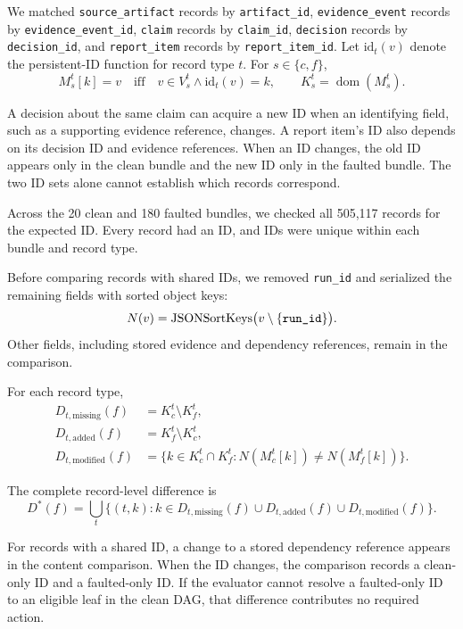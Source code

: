 \documentclass[sn-basic]{sn-jnl}%
\theoremstyle{thmstyleone}%
\theoremstyle{thmstyletwo}%
\theoremstyle{thmstylethree}%
\begin{document}
We matched \texttt{source\_artifact} records by \texttt{artifact\_id},
\texttt{evidence\_event} records by \texttt{evidence\_event\_id},
\texttt{claim} records by \texttt{claim\_id},
\texttt{decision} records by \texttt{decision\_id}, and
\texttt{report\_item} records by \texttt{report\_item\_id}.
Let \(\mathrm{id}_t(v)\) denote the persistent-ID function for record type \(t\).
For \(s \in \{c,f\}\),
\[
M_s^t[k] = v
\quad\text{iff}\quad
v \in V_s^t \land \mathrm{id}_t(v) = k,
\qquad
K_s^t = \operatorname{dom}(M_s^t).
\]

A decision about the same claim can acquire a new ID when an identifying field, such as a supporting evidence reference, changes. A report item's ID also depends on its decision ID and evidence references. When an ID changes, the old ID appears only in the clean bundle and the new ID only in the faulted bundle. The two ID sets alone cannot establish which records correspond.

Across the 20 clean and 180 faulted bundles, we checked all 505,117 records for the expected ID. Every record had an ID, and IDs were unique within each bundle and record type.

Before comparing records with shared IDs, we removed \texttt{run\_id} and serialized the remaining fields with sorted object keys:
\[
N(v) =
\operatorname{JSONSortKeys}\bigl(v \setminus \{\text{\texttt{run\_id}}\}\bigr).
\]
Other fields, including stored evidence and dependency references, remain in the comparison.

For each record type,
\[
\begin{aligned}
D_{t,\mathrm{missing}}(f)
  &= K_c^t \setminus K_f^t, \\
D_{t,\mathrm{added}}(f)
  &= K_f^t \setminus K_c^t, \\
D_{t,\mathrm{modified}}(f)
  &= \bigl\{ k \in K_c^t \cap K_f^t :
       N(M_c^t[k]) \ne N(M_f^t[k]) \bigr\}.
\end{aligned}
\]

The complete record-level difference is
\[
D^{*}(f) =
\bigcup_t
\bigl\{ (t,k) :
   k \in D_{t,\mathrm{missing}}(f)
    \cup D_{t,\mathrm{added}}(f)
    \cup D_{t,\mathrm{modified}}(f)
\bigr\}.
\]

For records with a shared ID, a change to a stored dependency reference appears in the content comparison. When the ID changes, the comparison records a clean-only ID and a faulted-only ID. If the evaluator cannot resolve a faulted-only ID to an eligible leaf in the clean DAG, that difference contributes no required action.
\end{document}
